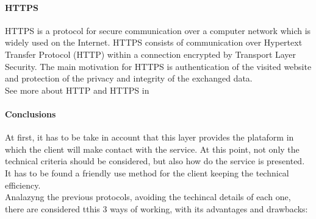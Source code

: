 \paragraph{HTTPS}
HTTPS is a protocol for secure communication over a computer network which is widely used on the Internet. HTTPS consists of communication over Hypertext Transfer Protocol (HTTP) within a connection encrypted by Transport Layer Security. The main motivation for HTTPS is authentication of the visited website and protection of the privacy and integrity of the exchanged data.
\\
See more about HTTP and HTTPS in \cite{HTTPS}


\paragraph{Conclusions} 
At first, it has to be take in account that this layer provides the plataform in which the client will make contact with the service. At this point, not only the technical criteria should be considered, but also how do the service is presented. It has to be found a friendly use method for the client keeping the technical efficiency.
\\
Analazyng the previous protocols, avoiding the techincal details of each one, there are considered tthis 3 ways of working, with its advantages and drawbacks:
